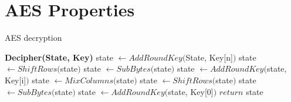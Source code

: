 \chapter{AES Properties}
\begin{algorithm}
\caption{AES decryption}
\label{decr}
\begin{algorithmic}
\State \textbf{Decipher(State, Key)}
\State state $\gets AddRoundKey($State, Key[n]$)$
\State state $\gets ShiftRows($state$)$
\State state $\gets SubBytes($state$)$
\vspace{0.5em}
    \State state $\gets AddRoundKey($state, Key[i]$)$
    \State state $\gets MixColumns($state$)$
    \State state $\gets ShiftRows($state$)$
    \State state $\gets SubBytes($state$)$
\EndFor
\vspace{0.5em}
\State state $\gets AddRoundKey($state, Key[0]$)$
\vspace{0.5em}
\State $return$ state
\end{algorithmic}
\end{algorithm}

